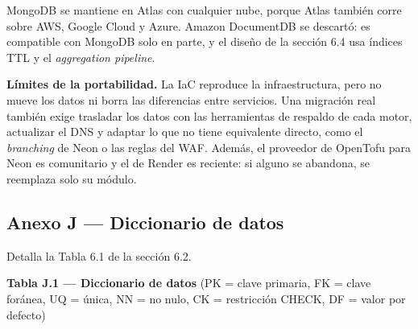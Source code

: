 \documentclass[11pt,a4paper]{article}
\begin{document}
MongoDB se mantiene en Atlas con cualquier nube, porque Atlas también corre sobre AWS, Google Cloud y Azure. Amazon DocumentDB se descartó: es compatible con MongoDB solo en parte, y el diseño de la sección 6.4 usa índices TTL y el \textit{aggregation pipeline}.

\textbf{Límites de la portabilidad.} La IaC reproduce la infraestructura, pero no mueve los datos ni borra las diferencias entre servicios. Una migración real también exige trasladar los datos con las herramientas de respaldo de cada motor, actualizar el DNS y adaptar lo que no tiene equivalente directo, como el \textit{branching} de Neon o las reglas del WAF. Además, el proveedor de OpenTofu para Neon es comunitario y el de Render es reciente: si alguno se abandona, se reemplaza solo su módulo.

\newpage
\subsection*{Anexo J --- Diccionario de datos}

Detalla la Tabla 6.1 de la sección 6.2.

\textbf{Tabla J.1 --- Diccionario de datos} (PK = clave primaria, FK = clave foránea, UQ = única, NN = no nulo, CK = restricción CHECK, DF = valor por defecto)\nopagebreak
\end{document}
